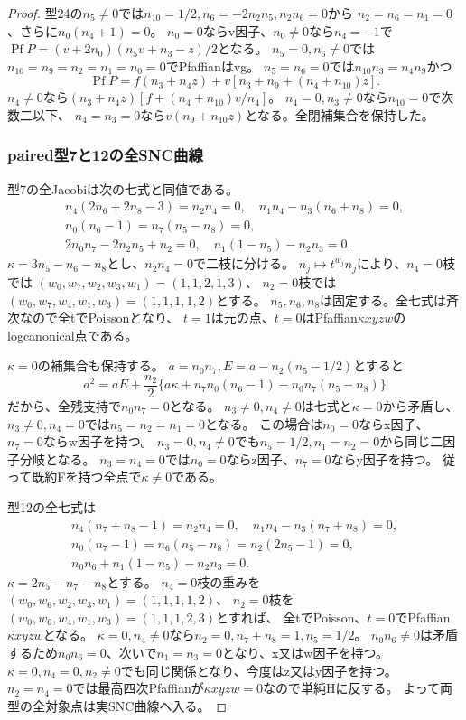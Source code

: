 \documentclass[a4paper,11pt]{ltjsarticle}
\theoremstyle{definition}
\begin{document}
\begin{proof}
型24の$n_5\ne0$では$n_{10}=1/2,n_6=-2n_2n_5,n_2n_6=0$から
$n_2=n_6=n_1=0$、さらに$n_0(n_4+1)=0$。
$n_0=0$ならv因子、$n_0\ne0$なら$n_4=-1$で
$\operatorname{Pf}P=(v+2n_0)(n_5v+n_3-z)/2$となる。
$n_5=0,n_6\ne0$では$n_{10}=n_9=n_2=n_1=n_0=0$でPfaffianはvg。
$n_5=n_6=0$では$n_{10}n_3=n_4n_9$かつ
\[
 \operatorname{Pf}P=f(n_3+n_4z)+v[n_3+n_9+(n_4+n_{10})z].
\]
$n_4\ne0$なら$(n_3+n_4z)[f+(n_4+n_{10})v/n_4]$。
$n_4=0,n_3\ne0$なら$n_{10}=0$で次数二以下、
$n_4=n_3=0$なら$v(n_9+n_{10}z)$となる。全閉補集合を保持した。

\subsubsection*{paired型7と12の全SNC曲線}
型7の全Jacobiは次の七式と同値である。
\[
\begin{gathered}
 n_4(2n_6+2n_8-3)=n_2n_4=0,\quad n_1n_4-n_3(n_6+n_8)=0,\\
 n_0(n_6-1)=n_7(n_5-n_8)=0,\\
 2n_0n_7-2n_2n_5+n_2=0,\quad n_1(1-n_5)-n_2n_3=0.
\end{gathered}
\]
$\kappa=3n_5-n_6-n_8$とし、$n_2n_4=0$で二枝に分ける。
$n_j\mapsto t^{w_j}n_j$により、$n_4=0$枝では
$(w_0,w_7,w_2,w_3,w_1)=(1,1,2,1,3)$、
$n_2=0$枝では$(w_0,w_7,w_4,w_1,w_3)=(1,1,1,1,2)$とする。
$n_5,n_6,n_8$は固定する。全七式は斉次なので全tでPoissonとなり、
$t=1$は元の点、$t=0$はPfaffian$\kappa xyzw$のlogcanonical点である。

$\kappa=0$の補集合も保持する。
$a=n_0n_7,E=a-n_2(n_5-1/2)$とすると
\[
 a^2=aE+\frac{n_2}{2}
 \{a\kappa+n_7n_0(n_6-1)-n_0n_7(n_5-n_8)\}
\]
だから、全残支持で$n_0n_7=0$となる。
$n_3\ne0,n_4\ne0$は七式と$\kappa=0$から矛盾し、
$n_3\ne0,n_4=0$では$n_5=n_2=n_1=0$となる。
この場合は$n_0=0$ならx因子、$n_7=0$ならw因子を持つ。
$n_3=0,n_4\ne0$でも$n_5=1/2,n_1=n_2=0$から同じ二因子分岐となる。
$n_3=n_4=0$では$n_0=0$ならz因子、$n_7=0$ならy因子を持つ。
従って既約Fを持つ全点で$\kappa\ne0$である。

型12の全七式は
\[
\begin{gathered}
 n_4(n_7+n_8-1)=n_2n_4=0,\quad n_1n_4-n_3(n_7+n_8)=0,\\
 n_0(n_7-1)=n_6(n_5-n_8)=n_2(2n_5-1)=0,\\
 n_0n_6+n_1(1-n_5)-n_2n_3=0.
\end{gathered}
\]
$\kappa=2n_5-n_7-n_8$とする。
$n_4=0$枝の重みを$(w_0,w_6,w_2,w_3,w_1)=(1,1,1,1,2)$、
$n_2=0$枝を$(w_0,w_6,w_4,w_1,w_3)=(1,1,1,2,3)$とすれば、
全tでPoisson、$t=0$でPfaffian$\kappa xyzw$となる。
$\kappa=0,n_4\ne0$なら$n_2=0,n_7+n_8=1,n_5=1/2$。
$n_0n_6\ne0$は矛盾するため$n_0n_6=0$、次いで$n_1=n_3=0$となり、x又はw因子を持つ。
$\kappa=0,n_4=0,n_2\ne0$でも同じ関係となり、今度はz又はy因子を持つ。
$n_2=n_4=0$では最高四次Pfaffianが$\kappa xyzw=0$なので単純Hに反する。
よって両型の全対象点は実SNC曲線へ入る。


\end{proof}
\end{document}
